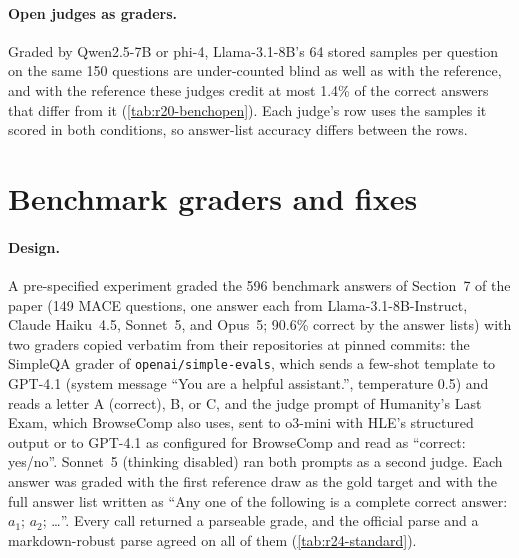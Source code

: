 \paragraph{Open judges as graders.}
Graded by Qwen2.5-7B or phi-4, Llama-3.1-8B's 64 stored samples per question on the same 150 questions are under-counted blind as well as with the reference, and with the reference these judges credit at most 1.4\% of the correct answers that differ from it (\cref{tab:r20-benchopen}).\ph{} Each judge's row uses the samples it scored in both conditions, so answer-list accuracy differs between the rows.

\begin{table}[htbp]
\centering
\caption{Open judges as graders of Llama-3.1-8B's stored samples on the 150 multi-answer \textsc{MACE} questions (a score of 7 or above counts as correct; question-level bootstrap).\ph}
\label{tab:r20-benchopen}
\footnotesize

\end{table}

\FloatBarrier
\section{Benchmark graders and fixes}
\label{app:r24}

\paragraph{Design.} A pre-specified experiment graded the 596 benchmark answers of Section~7 of the paper (149 \textsc{MACE} questions, one answer each from Llama-3.1-8B-Instruct, Claude Haiku~4.5, Sonnet~5, and Opus~5; 90.6\% correct by the answer lists) with two graders copied verbatim from their repositories at pinned commits: the SimpleQA grader of \texttt{openai/simple-evals}, which sends a few-shot template to GPT-4.1 (system message ``You are a helpful assistant.'', temperature 0.5) and reads a letter A (correct), B, or C, and the judge prompt of Humanity's Last Exam, which BrowseComp also uses, sent to o3-mini with HLE's structured output or to GPT-4.1 as configured for BrowseComp and read as ``correct: yes/no''. Sonnet~5 (thinking disabled) ran both prompts as a second judge. Each answer was graded with the first reference draw as the gold target and with the full answer list written as ``Any one of the following is a complete correct answer: $a_1$; $a_2$; \dots''. Every call returned a parseable grade, and the official parse and a markdown-robust parse agreed on all of them (\cref{tab:r24-standard}).

